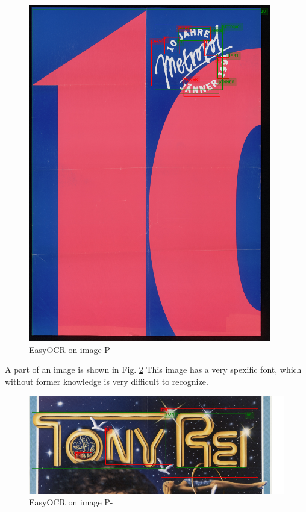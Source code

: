 \begin{figure}[hbtp!]
    \centering
    \includegraphics[scale=0.8]{obrazky/plakaty/result_easyOCR_vienna1_split_tuning_special_sensitive-55.png}
    \caption{EasyOCR on image P-}
    \label{Im5:ex:easy}
\end{figure}

A part of an image %
is shown in Fig. \ref*{Im6:ex:easy} This image has a very spexific font, which without former knowledge is very difficult to recognize.

\begin{figure}[hbtp!]
    \centering
    \includegraphics[width=\textwidth]{obrazky/plakaty/result_easyOCR_vienna2_nosplit_notuning_nocorrection-70.png}
    \caption{EasyOCR on image P-}
    \label{Im6:ex:easy}
\end{figure}


